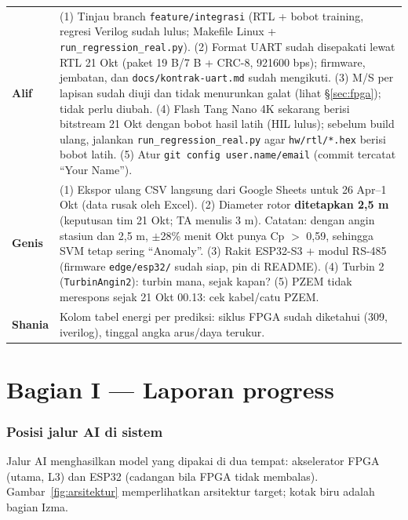\documentclass[10.5pt,a4paper]{article}
\newcommand{\cmd}[1]{\texttt{#1}}
\begin{document}
\begin{perhatian}
\begin{tabularx}{\linewidth}{@{}l X@{}}
\textcolor{alif}{\textbf{Alif}}   & (1) Tinjau branch \cmd{feature/integrasi} (RTL + bobot training, regresi Verilog sudah lulus; Makefile Linux
                                    + \cmd{run\_regression\_real.py}). (2) Format UART sudah disepakati lewat RTL 21 Okt (paket 19 B/7 B + CRC-8, 921600 bps); firmware, jembatan, dan \cmd{docs/kontrak-uart.md} sudah mengikuti. (3) M/S per lapisan sudah diuji dan tidak menurunkan galat (lihat \S\ref{sec:fpga}); tidak perlu diubah. (4) Flash Tang Nano 4K sekarang berisi bitstream 21 Okt dengan bobot hasil latih (HIL lulus); sebelum build ulang, jalankan \cmd{run\_regression\_real.py} agar \cmd{hw/rtl/*.hex} berisi bobot latih. (5) Atur \cmd{git config user.name/email} (commit tercatat ``Your Name''). \\
\textcolor{genis}{\textbf{Genis}} & (1) Ekspor ulang CSV langsung dari Google Sheets untuk 26 Apr--1 Okt (data rusak oleh Excel).
                                    (2) Diameter rotor \textbf{ditetapkan 2,5 m} (keputusan tim 21 Okt; TA menulis 3 m). Catatan: dengan angin stasiun dan 2,5 m, $\pm$28\% menit Okt punya Cp $>$ 0,59, sehingga SVM tetap sering ``Anomaly''.
                                    (3) Rakit ESP32-S3 + modul RS-485 (firmware \cmd{edge/esp32/} sudah siap, pin di README). (4) Turbin 2 (\cmd{TurbinAngin2}): turbin mana, sejak kapan?
                                    (5) PZEM tidak merespons sejak 21 Okt 00.13: cek kabel/catu PZEM. \\
\textcolor{shania}{\textbf{Shania}} & Kolom tabel energi per prediksi: siklus FPGA sudah diketahui (309, iverilog), tinggal angka arus/daya terukur. \\
\end{tabularx}
\end{perhatian}

\tableofcontents

\part*{Bagian I --- Laporan progress}

\section{Posisi jalur AI di sistem}
Jalur AI menghasilkan model yang dipakai di dua tempat: akselerator FPGA (utama, L3) dan ESP32 (cadangan bila FPGA
tidak membalas). Gambar~\ref{fig:arsitektur} memperlihatkan arsitektur target; kotak biru adalah bagian Izma.
\end{document}
